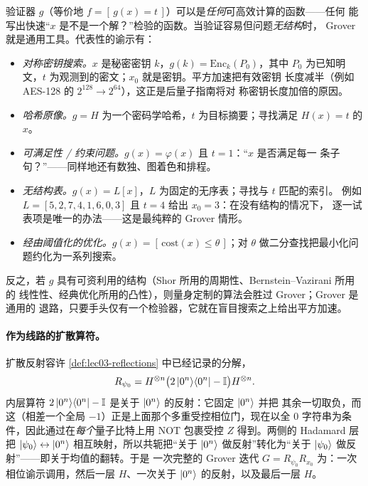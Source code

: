 \begin{remark}[搜索谕示的若干例子]
\label{rem:lec03-oracle-examples}
验证器 $g$（等价地 $f=[\,g(x)=t\,]$）可以是\emph{任何}可高效计算的函数——任何
能写出快速“$x$ 是不是一个解？”检验的函数。当验证容易但问题\emph{无结构}时，
Grover 就是通用工具。代表性的谕示有：
\begin{itemize}[leftmargin=1.4em,itemsep=1pt,topsep=2pt]
  \item \emph{对称密钥搜索。}$x$ 是秘密密钥 $k$，$g(k)=\mathrm{Enc}_k(P_0)$，其中
        $P_0$ 为已知明文，$t$ 为观测到的密文；$x_0$ 就是密钥。平方加速把有效密钥
        长度减半（例如 AES-128 的 $2^{128}\!\to\!2^{64}$），这正是后量子指南将对
        称密钥长度加倍的原因。
  \item \emph{哈希原像。}$g=H$ 为一个密码学哈希，$t$ 为目标摘要；寻找满足
        $H(x)=t$ 的 $x$。
  \item \emph{可满足性 / 约束问题。}$g(x)=\varphi(x)$ 且 $t=1$：“$x$ 是否满足每一
        条子句？”——同样地还有数独、图着色和排程。
  \item \emph{无结构表。}$g(x)=L[x]$，$L$ 为固定的无序表；寻找与 $t$ 匹配的索引。
        例如 $L=[5,2,7,4,1,6,0,3]$ 且 $t=4$ 给出 $x_0=3$：在没有结构的情况下，
        逐一试表项是唯一的办法——这是最纯粹的 Grover 情形。
  \item \emph{经由阈值化的优化。}$g(x)=[\,\mathrm{cost}(x)\le\theta\,]$；对 $\theta$
        做二分查找把最小化问题约化为一系列搜索。
\end{itemize}
反之，若 $g$ 具有可资利用的结构（Shor 所用的周期性、Bernstein--Vazirani 所用的
线性性、经典优化所用的凸性），则量身定制的算法会胜过 Grover；Grover 是通用的
退路，只要手头仅有一个检验器，它就在盲目搜索之上给出平方加速。
\end{remark}

\paragraph{作为线路的扩散算符。}
扩散反射容许 \cref{def:lec03-reflections} 中已经记录的分解，
\[
  R_{\psi_0}=H^{\otimes n}\bigl(2\ket{0^{n}}\!\bra{0^{n}}-\mathbb{I}\bigr)H^{\otimes n}.
\]
内层算符 $2\ket{0^n}\!\bra{0^n}-\mathbb{I}$ 是关于 $\ket{0^n}$ 的反射：它固定 $\ket{0^n}$ 并把
其余一切取负，而这（相差一个全局 $-1$）正是上面那个多重受控相位门，现在以全 $0$
字符串为条件，因此通过在\emph{每个}量子比特上用 NOT 包裹受控 $Z$ 得到。两侧的
Hadamard 层把 $\ket{\psi_0}\leftrightarrow\ket{0^n}$ 相互映射，所以共轭把“关于
$\ket{0^n}$ 做反射”转化为“关于 $\ket{\psi_0}$ 做反射”——即关于均值的翻转。于是
一次完整的 Grover 迭代 $G=R_{\psi_0}R_{x_0}$ 为：一次相位谕示调用，然后一层
$H$、一次关于 $\ket{0^n}$ 的反射，以及最后一层 $H$。

